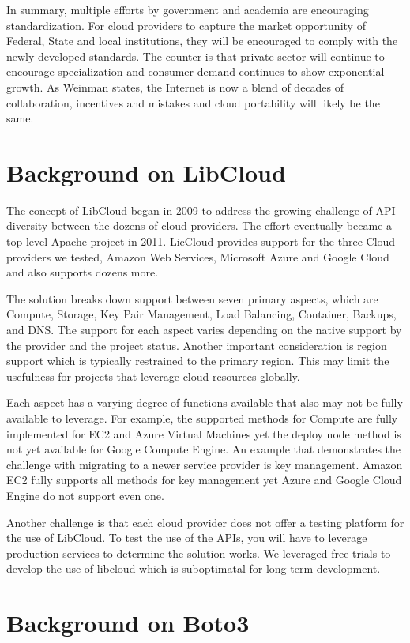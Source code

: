 In summary, multiple efforts by government and academia are encouraging
standardization. For cloud providers to capture the market opportunity of
Federal, State and local institutions, they will be encouraged to comply with
the newly developed standards. The counter is that private sector will continue
to encourage specialization and consumer demand continues to show exponential
growth. As Weinman states, the Internet is now a blend of decades of
collaboration, incentives and mistakes and cloud portability will likely be the
same.

\section{Background on LibCloud}

The concept of LibCloud began in 2009 to address the growing challenge of API
diversity between the dozens of cloud providers. The effort eventually became a
top level Apache project in 2011. LicCloud provides support for the three Cloud
providers we tested, Amazon Web Services, Microsoft Azure and Google Cloud and
also supports dozens more.

The solution breaks down support between seven primary aspects, which are
Compute, Storage, Key Pair Management, Load Balancing, Container, Backups, and
DNS. The support for each aspect varies depending on the native support by the
provider and the project status. Another important consideration is region
support which is typically restrained to the primary region. This may limit the
usefulness for projects that leverage cloud resources globally.

Each aspect has a varying degree of functions available that also may not be
fully available to leverage. For example, the supported methods for Compute are
fully implemented for EC2 and Azure Virtual Machines yet the deploy node method
is not yet available for Google Compute Engine. An example that demonstrates
the
challenge with migrating to a newer service provider is key management. Amazon
EC2 fully supports all methods for key management yet Azure and Google Cloud
Engine do not support even one.

Another challenge is that each cloud provider does not offer a testing platform
for the use of LibCloud. To test the use of the APIs, you will have to leverage
production services to determine the solution works. We leveraged free trials
to
develop the use of libcloud which is suboptimatal for long-term development.

\section{Background on Boto3}

